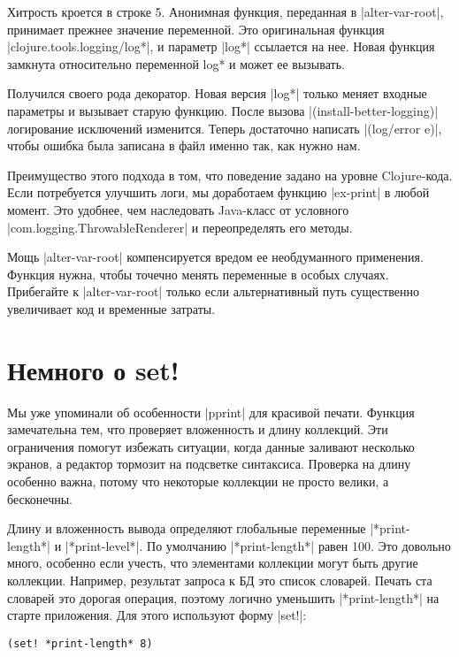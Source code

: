 Хитрость кроется в строке 5. Анонимная функция, переданная в \spverb|alter-var-root|,
принимает прежнее значение переменной. Это оригинальная функция
\spverb|clojure.tools.logging/log*|, и параметр \spverb|log*| ссылается на нее. Новая функция
замкнута относительно переменной log* и может ее вызывать.

Получился своего рода декоратор. Новая версия \spverb|log*| только меняет входные
параметры и вызывает старую функцию. После вызова \spverb|(install-better-logging)|
логирование исключений изменится. Теперь достаточно написать \spverb|(log/error e)|,
чтобы ошибка была записана в файл именно так, как нужно нам.

Преимущество этого подхода в том, что поведение задано на уровне
Clojure-кода. Если потребуется улучшить логи, мы доработаем функцию \spverb|ex-print| в
любой момент. Это удобнее, чем наследовать Java-класс от условного
\spverb|com.logging.ThrowableRenderer| и переопределять его методы.

Мощь \spverb|alter-var-root| компенсируется вредом ее необдуманного применения. Функция
нужна, чтобы точечно менять переменные в особых случаях. Прибегайте к
\spverb|alter-var-root| только если альтернативный путь существенно увеличивает код и
временные затраты.

\section{Немного о set!}

Мы уже упоминали об особенности \spverb|pprint| для красивой печати. Функция
замечательна тем, что проверяет вложенность и длину коллекций. Эти ограничения
помогут избежать ситуации, когда данные заливают несколько экранов, а редактор
тормозит на подсветке синтаксиса. Проверка на длину особенно важна, потому что
некоторые коллекции не просто велики, а бесконечны.

Длину и вложенность вывода определяют глобальные переменные \spverb|*print-length*| и
\spverb|*print-level*|. По умолчанию \spverb|*print-length*| равен 100. Это довольно много,
особенно если учесть, что элементами коллекции могут быть другие
коллекции. Например, результат запроса к БД это список словарей. Печать ста
словарей это дорогая операция, поэтому логично уменьшить \spverb|*print-length*| на
старте приложения. Для этого используют форму \spverb|set!|:

\begin{verbatim}
(set! *print-length* 8)
\end{verbatim}


